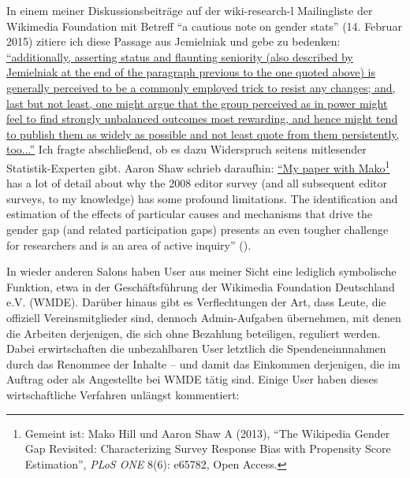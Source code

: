 \documentclass[fontsize=12pt]{scrartcl}
\begin{document}
In einem meiner Dis\-kus\-si\-onsbeitr\"age auf der wiki-research-l Mailing\-liste der Wikimedia Foundation mit Betreff "`a cautious note on gender stats"' (14. Februar 2015) zitiere ich diese Passage aus Jemielniak und gebe zu bedenken: \href{https://lists.wikimedia.org/pipermail/wiki-research-l/2015-February/004151.html}{"`additionally, asserting status and flaunting seniority (also described by Jemielniak at the end of the paragraph previous to the one quoted above) is gene\-rally perceived to be a commonly employed trick to resist any changes; and, last but not least, one might argue that the group perceived as \flq in power\frq\,\,might feel to find strongly unbalanced outcomes most rewarding, and hence might tend to publish them as widely as possible and not least quote from them persistently, too..."'} Ich fragte abschlie{\ss}end, ob es dazu Widerspruch sei\-tens mitlesender Statistik-Experten\textsuperscript{\tiny *} gibt. Aaron Shaw schrieb daraufhin: \href{https://lists.wikimedia.org/pipermail/wiki-research-l/2015-February/004172.html}{"`My paper with Mako\footnote{Gemeint ist: Mako Hill und Aaron Shaw A (2013), \href{http://journals.plos.org/plosone/article?id=10.1371/journal.pone.0065782\#pone-0065782-t002}{"`The Wi\-ki\-pe\-dia Gender Gap Revisited: Characterizing Survey Response Bias with Propensity Score Estimation"'}, \textit{PLoS ONE} 8(6): e65782, Open Access.} has a lot of detail about why the 2008 editor survey (and all subsequent editor surveys, to my know\-ledge) has some profound limitations. The identification and estimation of the effects of particular causes and mechanisms that drive the gender gap (and related participation gaps) presents an even tougher challenge for researchers and is an area of active inquiry"'} (\cite{Shaw2015}).

In wieder anderen Salons haben User aus meiner Sicht eine lediglich sym\-bo\-lische Funktion, etwa in der Gesch\"aftsf\"uh\-rung der Wikimedia Foundation Deutschland e.V. (WMDE). Dar\"uber hinaus gibt es Verflechtungen der Art, dass Leute, die offiziell Vereinsmitglieder sind, dennoch Admin-Aufgaben \"ubernehmen, mit denen die Arbei\-ten derjenigen, die sich ohne Bezahlung beteiligen, reguliert werden. Dabei erwirtschaften die unbezahlbaren User letzt\-lich die Spendeneinnnahmen durch das Renommee der Inhalte -- und damit das Einkommen derjenigen, die im Auftrag oder als Angestellte bei WMDE t\"atig sind. Einige User haben dieses wirtschaftliche Verfahren unl\"angst kommentiert: 
\end{document}
